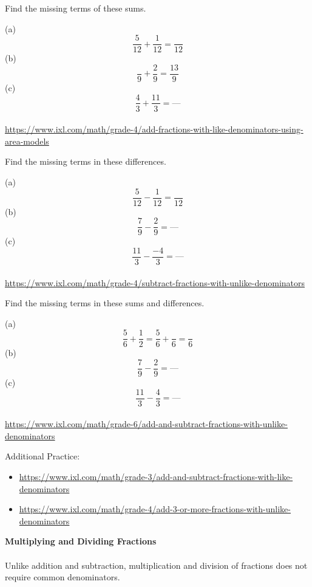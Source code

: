 \begin{exercise}
	Find the missing terms of these sums. 

	(a)	\[\frac{5}{12} + \frac{1}{12} = \frac{ }{12} \]
	(b)	\[\frac{ }{9} + \frac{2}{9} = \frac{13}{9} \]
	(c)	\[\frac{4}{3} + \frac{11}{3} = \text{---} \]
\\ 
	{\footnotesize \url{https://www.ixl.com/math/grade-4/add-fractions-with-like-denominators-using-area-models}}
\end{exercise} 
\begin{exercise}
	Find the missing terms in these differences.  
	
	(a)	\[\frac{5}{12} - \frac{1}{12} = \frac{}{12} \]
	(b)	\[\frac{7}{9} - \frac{2}{9} = \text{---}  \]
	(c)	\[\frac{11}{3} - \frac{-4}{3} = \text{---} \]
\\ 
	{\footnotesize \url{https://www.ixl.com/math/grade-4/subtract-fractions-with-unlike-denominators}}
\end{exercise} 
\begin{exercise}
	Find the missing terms in these sums and differences.  
	
	(a)	\[\frac{5}{6} + \frac{1}{2} = \frac{5}{6} + \frac{}{6} = \frac{}{6} \]
	(b)	\[\frac{7}{9} - \frac{2}{9} = \text{---}  \]
	(c)	\[\frac{11}{3} - \frac{4}{3} = \text{---} \]
\\ 	
	{\footnotesize \url{https://www.ixl.com/math/grade-6/add-and-subtract-fractions-with-unlike-denominators}}
\end{exercise} 
Additional Practice: 
\begin{itemize}
	\item {\footnotesize \url{https://www.ixl.com/math/grade-3/add-and-subtract-fractions-with-like-denominators}}
	\item {\footnotesize \url{https://www.ixl.com/math/grade-4/add-3-or-more-fractions-with-unlike-denominators}}
\end{itemize}





\newpage 
\textbf{Multiplying and Dividing Fractions}
\\ \\ 
Unlike addition and subtraction, multiplication and division of fractions does not require common denominators.  





